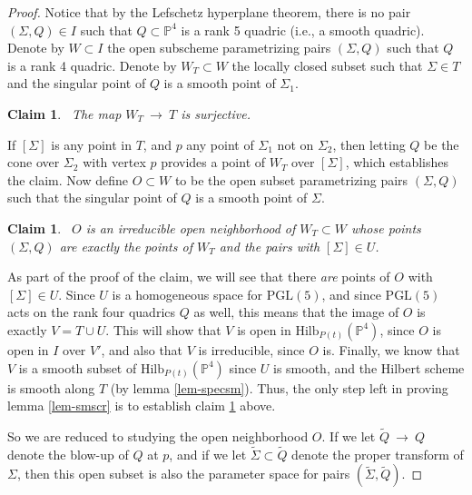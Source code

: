 \documentclass[twoside,12pt,reqno]{amsart}
\theoremstyle{plain}
\newtheorem{Claim}[thm]{Claim}
\theoremstyle{definition}
\newcommand{\PP}{\mathbb{P}}
\def\ps{\vspace{4pt}}
\begin{document}
\begin{proof}
\ps

Notice that by the Lefschetz hyperplane theorem, there is no pair
$(\Sigma,Q)\in I$ such that $Q\subset \PP^4$ is a rank 5 quadric
(i.e., a smooth quadric).  Denote by $W\subset I$ the open
subscheme parametrizing pairs $(\Sigma,Q)$ such that $Q$ is a rank 4
quadric.  Denote by $W_T\subset W$ the locally closed subset such that
$\Sigma\in T$ and the singular point of $Q$ is a smooth point of
$\Sigma_1$. 

\ps

\begin{Claim}~\label{claim-1} The map $W_T~\rightarrow~ T$ is
surjective.
\end{Claim}
  
If $[\Sigma]$ is any point in $T$, and $p$ any point of $\Sigma_1$ not on
$\Sigma_2$, then letting $Q$ be the cone over $\Sigma_2$ with vertex $p$
provides a point of $W_T$ over $[\Sigma]$, which establishes the claim.
Now define $O\subset W$ to be the open
subset parametrizing pairs 
$(\Sigma,Q)$ such that the singular point of $Q$ is a smooth point of
$\Sigma$. 

\ps

\begin{Claim}~\label{claim-2}  $O$ is an irreducible open 
neighborhood of $W_T\subset W$ whose points $(\Sigma,Q)$ are exactly the 
points of $W_T$ and the pairs with $[\Sigma]\in U$.  
\end{Claim}

As part of the proof of the claim, we will see that there {\em are} points of
$O$ with $[\Sigma]\in U$. Since $U$ is a
homogeneous space for $\text{PGL}(5)$, and since $\text{PGL}(5)$ acts on the
rank four quadrics $Q$ as well, this means that the image of $O$ is exactly
$V=T\cup U$.  This will show that $V$ is open in
$\text{Hilb}_{P(t)}(\PP^4)$, since $O$ is open in $I$ over $V'$, and also
that $V$ is irreducible, since $O$ is. Finally, we know that $V$ is a smooth
subset of $\text{Hilb}_{P(t)}(\PP^4)$ since $U$ is smooth, and the Hilbert
scheme is smooth along $T$ (by lemma \ref{lem-specsm}).  Thus, the only step
left in proving lemma \ref{lem-smscr} is to establish claim \ref{claim-2}
above.

 
\ps

So we are reduced to studying the open neighborhood $O$.  
If we let $\tilde{Q}~\rightarrow~ Q$ denote the blow-up of $Q$ at $p$, and
if we let $\widetilde{\Sigma}\subset \tilde{Q}$ denote the proper
transform of $\Sigma$, then this open subset is also the parameter
space for pairs $(\widetilde{\Sigma},\tilde{Q})$.  


\end{proof}
\end{document}

